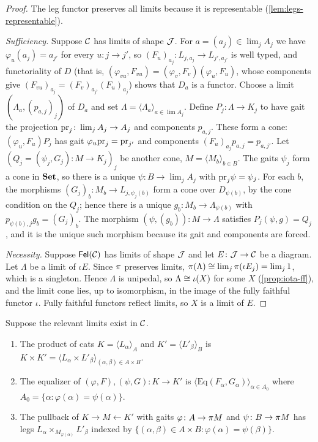 \begin{proof}
The leg functor preserves all limits because it is representable
(\cref{lem:legs-representable}).

\emph{Sufficiency.} Suppose $\mathcal{C}$ has limits of shape $\mathcal{J}$. For
$a=(a_j)\in\lim_jA_j$ we have $\varphi_u(a_j)=a_{j'}$ for every $u\colon j\to j'$,
so $(F_u)_{a_j}\colon L_{j,a_j}\to L_{j',a_{j'}}$ is well typed, and
functoriality of $D$ (that is, $(\varphi_{vu},F_{vu})=(\varphi_v,F_v)(\varphi_u,F_u)$,
whose components give $(F_{vu})_{a_j}=(F_v)_{a_{j'}}(F_u)_{a_j}$) shows that $D_a$
is a functor. Choose a limit $(\Lambda_a,(p_{a,j})_j)$ of $D_a$ and set
$\Lambda=\langle\Lambda_a\rangle_{a\in\lim A_j}$. Define $P_j\colon\Lambda\to K_j$
to have gait the projection $\mathrm{pr}_j\colon\lim_jA_j\to A_j$ and components
$p_{a,j}$. These form a cone: $(\varphi_u,F_u)P_j$ has gait $\varphi_u\mathrm{pr}_j=\mathrm{pr}_{j'}$
and components $(F_u)_{a_j}p_{a,j}=p_{a,j'}$. Let
$(Q_j=(\psi_j,G_j)\colon M\to K_j)_j$ be another cone, $M=\langle M_b\rangle_{b\in B}$.
The gaits $\psi_j$ form a cone in $\mathbf{Set}$, so there is a unique
$\psi\colon B\to\lim_jA_j$ with $\mathrm{pr}_j\psi=\psi_j$. For each $b$, the
morphisms $(G_j)_b\colon M_b\to L_{j,\psi_j(b)}$ form a cone over
$D_{\psi(b)}$, by the cone condition on the $Q_j$; hence there is a unique
$g_b\colon M_b\to\Lambda_{\psi(b)}$ with $p_{\psi(b),j}g_b=(G_j)_b$. The morphism
$(\psi,(g_b))\colon M\to\Lambda$ satisfies $P_j(\psi,g)=Q_j$, and it is the
unique such morphism because its gait and components are forced.

\emph{Necessity.} Suppose $\mathsf{Fel}(\mathcal{C})$ has limits of shape $\mathcal{J}$ and let
$E\colon\mathcal{J}\to\mathcal{C}$ be a diagram. Let $\Lambda$ be a limit of $\iota E$. Since
$\pi$ preserves limits, $\pi(\Lambda)\cong\lim_j\pi(\iota E_j)=\lim_j1$,
which is a singleton. Hence $\Lambda$ is unipedal, so $\Lambda\cong\iota(X)$ for
some $X$ (\cref{prop:iota-ff}), and the limit cone lies, up to isomorphism, in
the image of the fully faithful functor $\iota$. Fully faithful functors
reflect limits, so $X$ is a limit of $E$.
\end{proof}

\begin{corollary}\label{cor:limit-formulas}
Suppose the relevant limits exist in $\mathcal{C}$.
\begin{enumerate}
\item The product of cats $K=\langle L_\alpha\rangle_A$ and $K'=\langle L'_\beta\rangle_B$ is
  $K\times K'=\langle L_\alpha\times L'_\beta\rangle_{(\alpha,\beta)\in A\times B}$.
\item The equalizer of $(\varphi,F),(\psi,G)\colon K\to K'$ is
  $\langle\mathrm{Eq}(F_\alpha,G_\alpha)\rangle_{\alpha\in A_0}$ where
  $A_0=\{\alpha:\varphi(\alpha)=\psi(\alpha)\}$.
\item The pullback of $K\to M\leftarrow K'$ with gaits $\varphi\colon A\to\pi M$
  and $\psi\colon B\to\pi M$ has legs $L_\alpha\times_{M_{\varphi(\alpha)}}L'_\beta$
  indexed by $\{(\alpha,\beta)\in A\times B:\varphi(\alpha)=\psi(\beta)\}$.
\end{enumerate}
\end{corollary}

